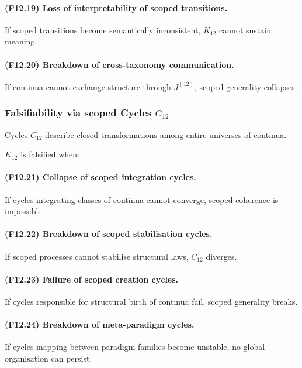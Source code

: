 \paragraph{(F12.19) Loss of interpretability of scoped transitions.}
If scoped transitions become semantically inconsistent,
$K_{12}$ cannot sustain meaning.

\paragraph{(F12.20) Breakdown of cross-taxonomy communication.}
If continua cannot exchange structure through $J^{(12)}$,
scoped generality collapses.



\subsubsection{Falsifiability via scoped Cycles $C_{12}$}

Cycles $C_{12}$ describe closed transformations among entire universes
of continua.

$K_{12}$ is falsified when:

\paragraph{(F12.21) Collapse of scoped integration cycles.}
If cycles integrating classes of continua cannot converge,
scoped coherence is impossible.

\paragraph{(F12.22) Breakdown of scoped stabilisation cycles.}
If scoped processes cannot stabilise structural laws,
$C_{12}$ diverges.

\paragraph{(F12.23) Failure of scoped creation cycles.}
If cycles responsible for structural birth of continua fail,
scoped generality breaks.

\paragraph{(F12.24) Breakdown of meta-paradigm cycles.}
If cycles mapping between paradigm families become unstable,
no global organisation can persist.

